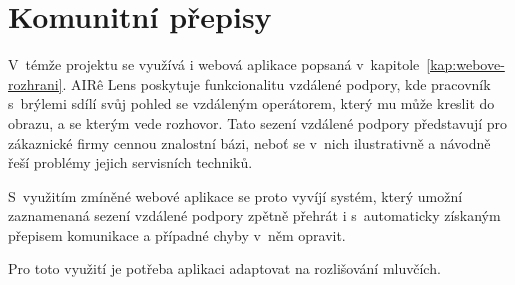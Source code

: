 \section{Komunitní přepisy}

V~témže projektu se využívá i webová aplikace popsaná
v~kapitole~\ref{kap:webove-rozhrani}. AIR\^{e} Lens poskytuje funkcionalitu
vzdálené podpory, kde pracovník s~brýlemi sdílí svůj pohled se vzdáleným
operátorem, který mu může kreslit do obrazu, a se kterým vede rozhovor. Tato
sezení vzdálené podpory představují pro zákaznické firmy cennou znalostní bázi,
neboť se v~nich ilustrativně a návodně řeší problémy jejich servisních techniků.

S~využitím zmíněné webové aplikace se proto vyvíjí systém, který umožní
zaznamenaná sezení vzdálené podpory zpětně přehrát i s~automaticky získaným
přepisem komunikace a případné chyby v~něm opravit.

Pro toto využití je potřeba aplikaci adaptovat na rozlišování mluvčích.
